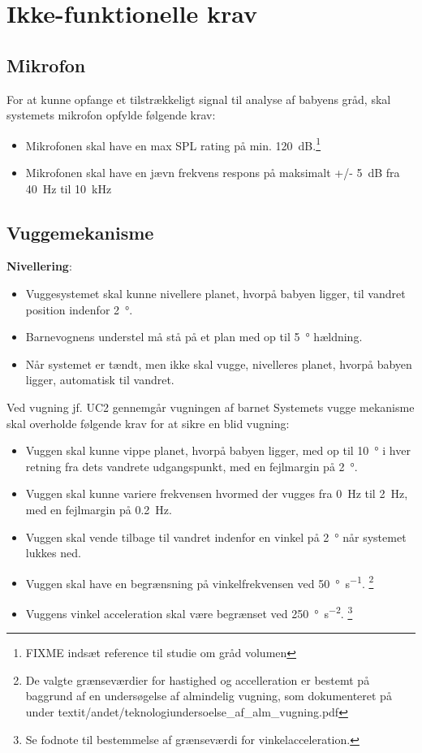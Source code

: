 \section{Ikke-funktionelle krav}

\subsection*{Mikrofon}
For at kunne opfange et tilstrækkeligt signal til analyse af babyens gråd, skal systemets mikrofon opfylde følgende krav:
\begin{itemize}
\item Mikrofonen skal have en max SPL rating på min. \SI{120}{\dB}.\footnote{FIXME indsæt reference til studie om gråd volumen}
\item Mikrofonen skal have en jævn frekvens respons på maksimalt +/- \SI{5}{\dB} fra \SI{40}{\hertz} til \SI{10}{\kilo\hertz}
\end{itemize}

\subsection*{Vuggemekanisme}

\textbf{Nivellering}: \label{kravspec:ikke_funk_nivellering}
\begin{itemize}
	\item Vuggesystemet skal kunne nivellere planet, hvorpå babyen ligger, til vandret position indenfor \SI{2}{\degree}.
	\item Barnevognens understel må stå på et plan med op til \SI{5}{\degree} hældning.
	\item Når systemet er tændt, men ikke skal vugge, nivelleres planet, hvorpå babyen ligger, automatisk til vandret.
\end{itemize}

Ved vugning jf. UC2 gennemgår vugningen af barnet
Systemets vugge mekanisme skal overholde følgende krav for at sikre en blid vugning:
\begin{itemize}
\item Vuggen skal kunne vippe planet, hvorpå babyen ligger, med op til \SI{10}{\degree} i hver retning fra dets vandrete udgangspunkt, med en fejlmargin på \SI{2}{\degree}.
\item Vuggen skal kunne variere frekvensen hvormed der vugges fra \SI{0}{\hertz} til \SI{2}{\hertz}, med en fejlmargin på \SI{0.2}{\hertz}.
\item Vuggen skal vende tilbage til vandret indenfor en vinkel på \SI{2}{\degree} når systemet lukkes ned.
\item Vuggen skal have en begrænsning på vinkelfrekvensen ved \SI{50}{\degree\per\second}. \footnote{De valgte grænseværdier for hastighed og accelleration er bestemt på baggrund af en undersøgelse af almindelig vugning, som dokumenteret på \citep{cd} under textit{/andet/teknologiundersoelse\_af\_alm\_vugning.pdf}}
\item Vuggens vinkel acceleration skal være begrænset ved \SI{250}{\degree\per\square\second}. \footnote{Se fodnote til bestemmelse af grænseværdi for vinkelacceleration.}
\end{itemize}

